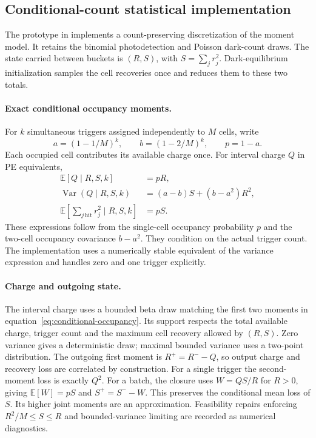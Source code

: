 \documentclass[11pt]{article}
\newcommand{\E}{\mathbb{E}}
\newcommand{\Var}{\operatorname{Var}}
\newcommand{\code}[1]{\path{#1}}
\begin{document}
\subsection{Conditional-count statistical implementation}
\label{sec:statistical-implementation}
The prototype in \code{src/ion_signal/sipm_statistical.jl} implements a
count-preserving discretization of the moment model. It retains the binomial
photodetection and Poisson dark-count draws. The state carried between buckets
is $(R,S)$, with $S=\sum_j r_j^2$. Dark-equilibrium initialization samples the
cell recoveries once and reduces them to these two totals.

\paragraph{Exact conditional occupancy moments.}
For $k$ simultaneous triggers assigned independently to $M$ cells, write
\begin{equation}
 a=(1-1/M)^k,\qquad b=(1-2/M)^k,\qquad p=1-a.
\end{equation}
Each occupied cell contributes its available charge once. For interval charge
$Q$ in PE equivalents,
\begin{align}
 \E[Q\mid R,S,k]&=pR,\\
 \Var(Q\mid R,S,k)&=(a-b)S+(b-a^2)R^2,\\
 \E\!\left[\sum_{j\,\mathrm{hit}}r_j^2\mid R,S,k\right]&=pS.
 \label{eq:conditional-occupancy}
\end{align}
These expressions follow from the single-cell occupancy probability $p$ and
the two-cell occupancy covariance $b-a^2$. They condition on the actual
trigger count. The implementation uses a numerically stable equivalent of
the variance expression and handles zero and one trigger explicitly.

\paragraph{Charge and outgoing state.}
The interval charge uses a bounded beta draw matching the first two moments
in equation~\eqref{eq:conditional-occupancy}. Its support respects the total
available charge, trigger count and the maximum cell recovery allowed by
$(R,S)$. Zero variance gives a deterministic draw; maximal bounded variance
uses a two-point distribution. The outgoing first moment is $R^+=R^--Q$,
so output charge and recovery loss are correlated by construction.
For a single trigger the second-moment loss is exactly $Q^2$. For a batch,
the closure uses $W=QS/R$ for $R>0$, giving $\E[W]=pS$ and $S^+=S^--W$.
This preserves the conditional mean loss of $S$. Its higher joint moments
are an approximation. Feasibility repairs enforcing $R^2/M\leq S\leq R$
and bounded-variance limiting are recorded as numerical diagnostics.
\end{document}

